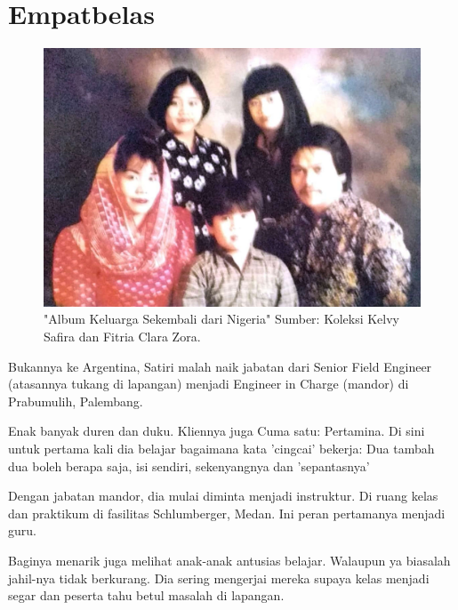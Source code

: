 
\chapter{Empatbelas}

\begin{figure}[htbp]
\centerline{\includegraphics[scale=1.0]{01-14-01}}
\caption{"Album Keluarga Sekembali dari Nigeria" Sumber: Koleksi Kelvy Safira dan Fitria Clara Zora.}
\label{01-14-01}
\end{figure}
%

Bukannya ke Argentina, Satiri malah naik jabatan dari Senior Field Engineer (atasannya tukang di lapangan) menjadi Engineer in Charge (mandor) di Prabumulih, Palembang.

Enak banyak duren dan duku. Kliennya juga Cuma satu: Pertamina. Di sini untuk pertama kali dia belajar bagaimana kata 'cingcai' bekerja: Dua tambah dua boleh berapa saja, isi sendiri, sekenyangnya dan 'sepantasnya'

Dengan jabatan mandor, dia mulai diminta menjadi instruktur. Di ruang kelas dan praktikum di fasilitas Schlumberger, Medan. Ini peran pertamanya menjadi guru.

Baginya menarik juga melihat anak-anak antusias belajar. Walaupun ya biasalah jahil-nya tidak berkurang. Dia sering mengerjai mereka supaya kelas menjadi segar dan peserta tahu betul masalah di lapangan.

